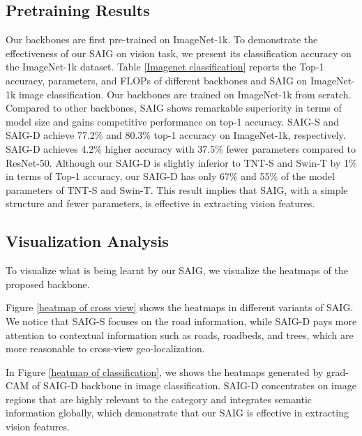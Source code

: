 \documentclass[sn-basic,iicol]{sn-jnl}
\theoremstyle{thmstyletwo}\newtheorem{example}{Example}\newtheorem{remark}{Remark}
\theoremstyle{thmstylethree}\newtheorem{definition}{Definition}
\begin{document}
\subsection{Pretraining Results} Our backbones are first pre-trained on ImageNet-1k. To demonstrate the effectiveness of our SAIG on vision task, we present its classification accuracy on the ImageNet-1k dataset. Table \ref{Imagenet classification} reports the Top-1 accuracy, parameters, and FLOPs of different backbones and SAIG on ImageNet-1k image classification. Our backbones are trained on ImageNet-1k from scratch. Compared to other backbones, SAIG shows remarkable superiority in terms of model size and gains competitive performance on top-1 accuracy. SAIG-S and SAIG-D achieve 77.2\% and 80.3\% top-1 accuracy on ImageNet-1k, respectively. SAIG-D achieves 4.2\% higher accuracy with 37.5\% fewer parameters compared to ResNet-50. 
Although our SAIG-D is slightly inferior to TNT-S and Swin-T by 1\% in terms of Top-1 accuracy, our SAIG-D has only 67\% and 55\% of the model parameters of TNT-S and Swin-T.
This result implies that SAIG, with a simple structure and fewer parameters, is effective in extracting vision features.





\subsection{Visualization Analysis}




 To visualize what is being learnt by our SAIG, we visualize the heatmaps of the proposed backbone. 


Figure \ref{heatmap of cross view} shows the heatmaps in different variants of SAIG. We notice that SAIG-S focuses on the road information, while SAIG-D pays more attention to contextual information such as roads, roadbeds, and trees, which are more reasonable to cross-view geo-localization. 

In Figure \ref{heatmap of classification}, we shows the heatmaps generated by grad-CAM \citep{selvaraju2017grad} of SAIG-D backbone in image classification. SAIG-D concentrates on image regions that are highly relevant to the category and integrates semantic information globally, which demonstrate that our SAIG is effective in extracting vision features.
\end{document}
